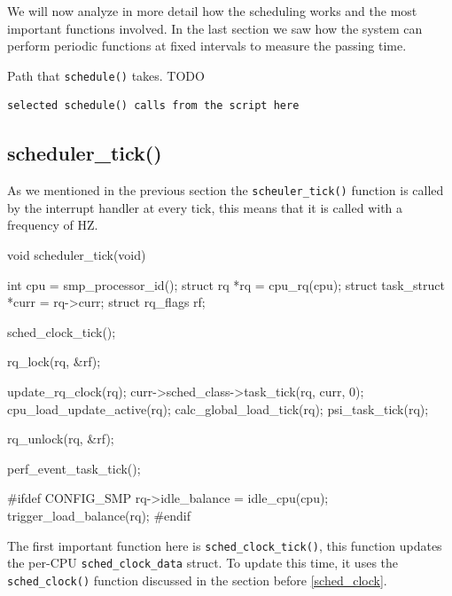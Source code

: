 We will now analyze in more detail how the scheduling works and the most important functions involved. In the last section we saw how the system can perform periodic functions at fixed intervals to measure the passing time.

Path that \verb|schedule()| takes. TODO

\begin{Verbatim}
selected schedule() calls from the script here
\end{Verbatim}

\subsection{scheduler\_tick()}
As we mentioned in the previous section the \verb|scheuler_tick()|  function is called by the interrupt handler at every tick, this means that it is called with a frequency of HZ.

\begin{code}
void scheduler_tick(void)
{
	int cpu = smp_processor_id();
	struct rq *rq = cpu_rq(cpu);
	struct task_struct *curr = rq->curr;
	struct rq_flags rf;

	sched_clock_tick();

	rq_lock(rq, &rf);

	update_rq_clock(rq);
	curr->sched_class->task_tick(rq, curr, 0);
	cpu_load_update_active(rq);
	calc_global_load_tick(rq);
	psi_task_tick(rq);

	rq_unlock(rq, &rf);

	perf_event_task_tick();

#ifdef CONFIG_SMP
	rq->idle_balance = idle_cpu(cpu);
	trigger_load_balance(rq);
#endif
}
\end{code}

The first important function here is \verb|sched_clock_tick()|, this function updates the per-CPU \verb|sched_clock_data| struct. To update this time, it uses the \verb|sched_clock()| function discussed in the section before \ref{sched_clock}.

